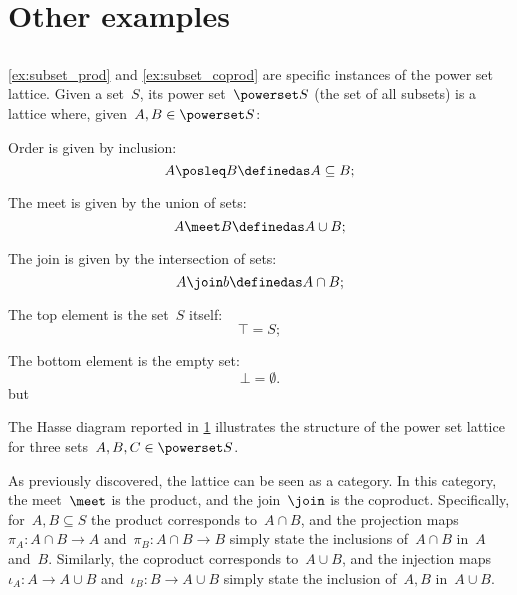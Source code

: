\section{Other examples}

\subsection{}
\cref{ex:subset_prod} and \cref{ex:subset_coprod} are specific instances of the power set lattice. Given a set~$S$, its power set~$\powerset S$ (the set of all subsets) is a lattice where, given~$A,B\in \powerset S$:
\begin{compactitem}
  \item Order is given by inclusion:
  \begin{equation*}
    A\posleq B \definedas A\subseteq B;
  \end{equation*}
  \item The meet is given by the union of sets:
  \begin{equation*}
    A\meet B \definedas A\cup B;
  \end{equation*}
  \item The join is given by the intersection of sets:
  \begin{equation*}
    A\join b \definedas A\cap B;
  \end{equation*}
  \item The top element is the set~$S$ itself:
  \begin{equation*}
    \top = S;
  \end{equation*}
  \item The bottom element is the empty set:
  \begin{equation*}
    \bot = \emptyset.
  \end{equation*}but
\end{compactitem}
The Hasse diagram reported in \cref{fig:prod_coprod_power} illustrates the structure of the power set lattice for three sets~$A,B,C\in \powerset S$.

\begin{figure}[h]
  \begin{center}
  \end{center}
  \caption{\label{fig:prod_coprod_power}}
\end{figure}
As previously discovered, the lattice can be seen as a category.
In this category, the meet~$\meet$ is the product, and the join~$\join$ is the coproduct.
Specifically, for~$A,B\subseteq S$ the product corresponds to~$A\cap B$, and the projection maps~$\pi_A\colon A\cap B\to A$ and~$\pi_B\colon A\cap B\to B$ simply state the inclusions of~$A\cap B$ in~$A$ and~$B$.
Similarly, the coproduct corresponds to~$A\cup B$, and the injection maps~$\iota_A\colon A\to A\cup B$ and~$\iota_B\colon B\to A\cup B$ simply state the inclusion of~$A,B$ in~$A\cup B$.

\subsubsection{}


